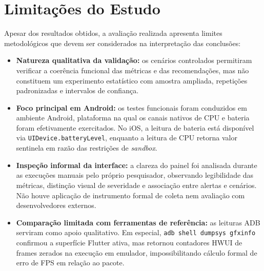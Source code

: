 \section{Limitações do Estudo}

Apesar dos resultados obtidos, a avaliação realizada apresenta limites metodológicos que devem ser considerados na interpretação das conclusões:

\begin{itemize}
  \item \textbf{Natureza qualitativa da validação:} os cenários controlados permitiram verificar a coerência funcional das métricas e das recomendações, mas não constituem um experimento estatístico com amostra ampliada, repetições padronizadas e intervalos de confiança.

  \item \textbf{Foco principal em Android:} os testes funcionais foram conduzidos em ambiente Android, plataforma na qual os canais nativos de CPU e bateria foram efetivamente exercitados. No iOS, a leitura de bateria está disponível via \texttt{UIDevice.batteryLevel}, enquanto a leitura de CPU retorna valor sentinela em razão das restrições de \textit{sandbox}.

  \item \textbf{Inspeção informal da interface:} a clareza do painel foi analisada durante as execuções manuais pelo próprio pesquisador, observando legibilidade das métricas, distinção visual de severidade e associação entre alertas e cenários. Não houve aplicação de instrumento formal de coleta nem avaliação com desenvolvedores externos.

  \item \textbf{Comparação limitada com ferramentas de referência:} as leituras ADB serviram como apoio qualitativo. Em especial, \texttt{adb shell dumpsys gfxinfo} confirmou a superfície Flutter ativa, mas retornou contadores HWUI de frames zerados na execução em emulador, impossibilitando cálculo formal de erro de FPS em relação ao pacote.
\end{itemize}

